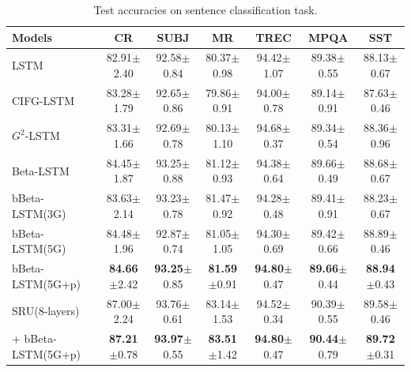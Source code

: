\documentclass[letterpaper]{article} %
\begin{document}


\begin{table}[h!]
	\centering
	\begin{tabular}{lcccccc}
		\toprule
		\bfseries Models & \bfseries CR & \bfseries SUBJ & \bfseries MR & \bfseries TREC & \bfseries MPQA & \bfseries SST\\
		\midrule
		LSTM & 82.91$\pm$2.40 & 92.58$\pm$0.84 & 80.37$\pm$0.98& 94.42$\pm$1.07 & 89.38$\pm$0.55 &88.13$\pm$0.67\\
		CIFG-LSTM & 83.28$\pm$1.79 & 92.65$\pm$0.86& 79.86$\pm$0.91& 94.00$\pm$0.78& 89.14$\pm$0.91 & 87.63$\pm$0.46\\
		$G^{2}$-LSTM  & 83.31$\pm$1.66 & 92.69$\pm$0.78& 80.13$\pm$1.10& 94.68$\pm$0.37& 89.34$\pm$0.54& 88.36$\pm$0.96\\
		\midrule
		Beta-LSTM  & 84.45$\pm$1.87 & 93.25$\pm$0.88& 81.12$\pm$0.93& 94.38$\pm$0.64& 89.66$\pm$0.49& 88.68$\pm$0.67\\
		bBeta-LSTM(3G)  & 83.63$\pm$2.14 & 93.23$\pm$0.78& 81.47$\pm$0.92& 94.28$\pm$0.48 & 89.41$\pm$0.91& 88.23$\pm$0.67\\
		bBeta-LSTM(5G) & 84.48$\pm$1.96 & 92.87$\pm$0.74& 81.05$\pm$1.05& 94.30$\pm$0.69& 89.42$\pm$0.66& 88.89$\pm$0.46\\
		bBeta-LSTM(5G+p) & \textbf{84.66}$\pm$2.42 & \textbf{93.25}$\pm$0.85&\textbf{81.59}$\pm$0.91&\textbf{94.80}$\pm$0.47&\textbf{89.66}$\pm$0.44&\textbf{88.94}$\pm$0.43 \\
		\midrule
		SRU(8-layers) & 87.00$\pm$2.24 & 93.76$\pm$0.61 & 83.14$\pm$1.53 & 94.52$\pm$0.34 & 90.39$\pm$0.55 & 89.58$\pm$0.46\\
		\hspace{1pt} + bBeta-LSTM(5G+p)  & \textbf{87.21}$\pm$0.78 & \textbf{93.97}$\pm$0.55 & \textbf{83.51}$\pm$1.42 & \textbf{94.80}$\pm$0.47 & \textbf{90.44}$\pm$0.79 & \textbf{89.72}$\pm$0.31\\
		\bottomrule
	\end{tabular}
	\caption{Test accuracies on sentence classification task.}
	\label{table:sentence}
\end{table}
\end{document}
